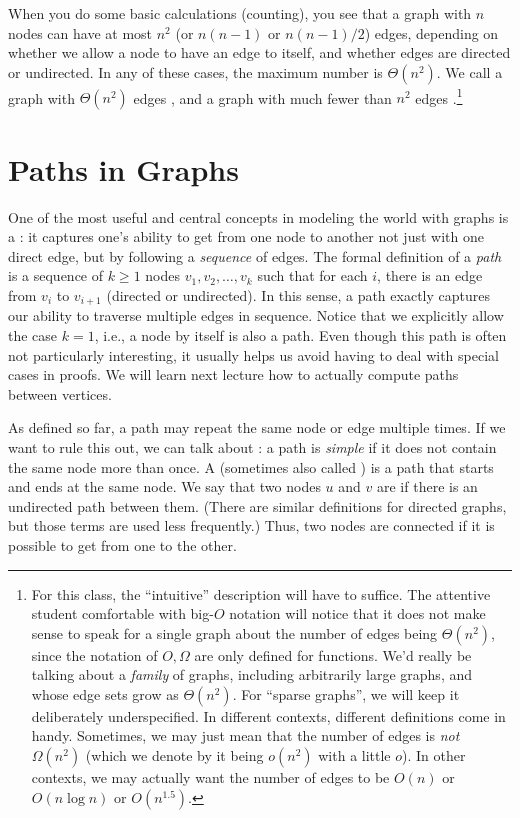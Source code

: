 When you do some basic calculations (counting), you see that a
graph with $n$ nodes can have at most $n^2$ (or $n(n-1)$ or
$n(n-1)/2$) edges, depending on whether we allow a node to have an
edge to itself, and whether edges are directed or undirected.
In any of these cases, the maximum number is $\Theta(n^2)$. 
We call a graph with $\Theta(n^2)$ edges , and a graph
with much fewer than $n^2$ edges .\footnote{For this
    class, the ``intuitive'' description will have to suffice. The
    attentive student comfortable with big-$O$ notation will notice
    that it does not make sense to speak for a single graph about the
    number of edges being $\Theta(n^2)$, since the notation of
    $O,\Omega$ are only defined for functions. We'd really be talking
    about a \emph{family} of graphs, including arbitrarily large
    graphs, and whose edge sets grow as $\Theta(n^2)$.
    For ``sparse graphs'', we will keep it deliberately
    underspecified. In different contexts, different definitions come
    in handy. Sometimes, we may just mean that the number of edges is
    \emph{not} $\Omega(n^2)$ (which we denote by it being $o(n^2)$
    with a little $o$). In other contexts, we may actually want the
    number of edges to be $O(n)$ or $O(n \log n)$ or $O(n^{1.5})$.}

\section{Paths in Graphs}
One of the most useful and central concepts in modeling the world with
graphs is a : it captures one's ability to get from one
node to another not just with one direct edge, but by following a
\emph{sequence} of edges.
The formal definition of a \emph{path} is a sequence of $k \geq 1$ nodes
$v_1, v_2, \ldots, v_k$ such that for each $i$, there is an edge from
$v_i$ to $v_{i+1}$ (directed or undirected).
In this sense, a path exactly captures our ability to traverse
multiple edges in sequence.
Notice that we explicitly allow the case $k=1$, i.e., a node by itself
is also a path. Even though this path is often not particularly
interesting, it usually helps us avoid having to deal with special
cases in proofs. 
We will learn next lecture how to actually compute paths between
vertices.

As defined so far, a path may repeat the same node or edge multiple
times. If we want to rule this out, we can talk about : a path is \emph{simple} if it does not contain the same node
more than once.
A  (sometimes also called ) is a path that
starts and ends at the same node. 
We say that two nodes $u$ and $v$ are  if there is an
undirected path between them. (There are similar definitions for
directed graphs, but those terms are used less frequently.)
Thus, two nodes are connected if it is possible to get from one to the
other.

